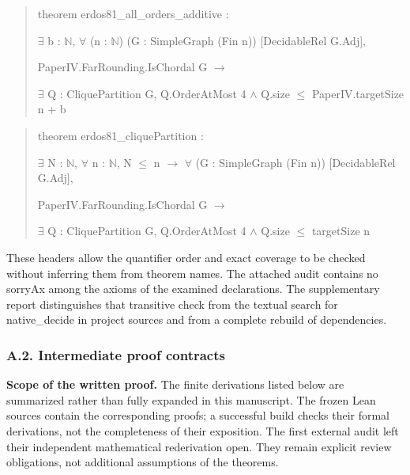 \documentclass[english,11pt,a4paper]{article}
\begin{document}
\begin{quote}\footnotesize\ttfamily\raggedright
theorem erdos81\_all\_orders\_additive :\par
    \(\exists\) b : \(\mathbb N\), \(\forall\) (n : \(\mathbb N\)) (G : SimpleGraph (Fin n)) [DecidableRel G.Adj],\par
      PaperIV.FarRounding.IsChordal G \(\to\)\par
        \(\exists\) Q : CliquePartition G, Q.OrderAtMost 4 \(\land\) Q.size \(\le\) PaperIV.targetSize n + b\par
\end{quote}

\begin{quote}\footnotesize\ttfamily\raggedright
theorem erdos81\_cliquePartition :\par
    \(\exists\) N : \(\mathbb N\), \(\forall\) n : \(\mathbb N\), N \(\le\) n \(\to\) \(\forall\) (G : SimpleGraph (Fin n)) [DecidableRel G.Adj],\par
      PaperIV.FarRounding.IsChordal G \(\to\)\par
        \(\exists\) Q : CliquePartition G, Q.OrderAtMost 4 \(\land\) Q.size \(\le\) targetSize n\par
\end{quote}

These headers allow the quantifier order and exact coverage to be checked without inferring them from theorem names. The attached audit contains no {\ttfamily\small sorryAx} among the axioms of the examined declarations. The supplementary report distinguishes that transitive check from the textual search for {\ttfamily\small native\_\discretionary{\hbox{\ensuremath{\hookrightarrow}}}{}{}decide} in project sources and from a complete rebuild of dependencies.

\subsubsection{A.2. Intermediate proof contracts}\label{a.2.-intermediate-proof-contracts}

\textbf{Scope of the written proof.} The finite derivations listed below are summarized rather than fully expanded in this manuscript. The frozen Lean sources contain the corresponding proofs; a successful build checks their formal derivations, not the completeness of their exposition. The first external audit left their independent mathematical rederivation open. They remain explicit review obligations, not additional assumptions of the theorems.
\end{document}
